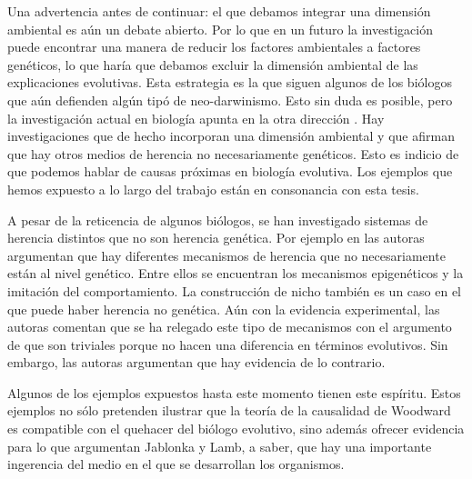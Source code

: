 Una advertencia antes de continuar: el que debamos integrar una dimensión ambiental es aún un debate abierto. Por lo que en un futuro la investigación puede encontrar una manera de reducir los factores ambientales a factores genéticos, lo que haría que debamos excluir la dimensión ambiental de las explicaciones evolutivas. Esta estrategia es la que siguen algunos de los biólogos que aún defienden algún tipó de neo-darwinismo. Esto sin duda es posible, pero la investigación actual en biología apunta en la otra dirección  \cite{Bateson2014}. Hay investigaciones que de hecho incorporan una dimensión ambiental y que afirman que hay otros medios de herencia no necesariamente genéticos. Esto es indicio de que podemos hablar de causas próximas en biología evolutiva. Los ejemplos que hemos expuesto a lo largo del trabajo están en consonancia con esta tesis.

A pesar de la reticencia de algunos biólogos, se han investigado sistemas de herencia distintos que no son herencia genética. Por ejemplo en \cite{Jablonka2020} las autoras argumentan que hay diferentes mecanismos de herencia que no necesariamente están al nivel genético. Entre ellos se encuentran los mecanismos epigenéticos y la imitación del comportamiento. La construcción de nicho también es un caso en el que puede haber herencia no genética. Aún con la evidencia experimental, las autoras comentan que se ha relegado este tipo de mecanismos con el argumento de que son triviales porque no hacen una diferencia en términos evolutivos. Sin embargo, las autoras argumentan que hay evidencia de lo contrario.

Algunos de los ejemplos expuestos hasta este momento tienen este espíritu. Estos ejemplos no sólo pretenden ilustrar que la teoría de la causalidad de Woodward es compatible con el quehacer del biólogo evolutivo, sino además ofrecer evidencia para lo que argumentan Jablonka y Lamb, a saber, que hay una importante ingerencia del medio en el que se desarrollan los organismos.

